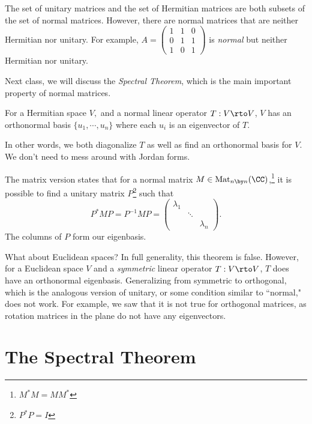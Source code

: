 The set of unitary matrices and the set of Hermitian matrices are both subsets of the set of normal matrices. However, there are normal matrices that are neither Hermitian nor unitary. For example, $A = \begin{pmatrix}1 & 1 & 0 \\ 0 & 1 & 1 \\ 1 & 0 & 1 \end{pmatrix}$ is \emph{normal} but neither Hermitian nor unitary. 

Next class, we will discuss the \emph{Spectral Theorem}, which is the main important property of normal matrices.
\begin{theorem}
For a Hermitian space $V,$ and a normal linear operator $T: V \rto V$, $V$ has an orthonormal basis $\{u_1, \cdots, u_n\}$ where each $u_i$ is an eigenvector of $T.$
\end{theorem}
In other words, we both diagonalize $T$ as well as find an orthonormal basis for $V$. 
We don't need to mess around with Jordan forms. 

The matrix version states that for a normal matrix $M \in \text{Mat}_{n \by n}(\CC)$,\footnote{$M^*M = MM^*$} it is possible to find a unitary matrix $P$\footnote{$P^*P = I$} such that \[P^*MP = P^{-1}MP = \begin{pmatrix} \lambda_1 & & \\
& \ddots & \\ & & \lambda_n\end{pmatrix}.\] The columns of $P$ form our eigenbasis. 

What about Euclidean spaces? In full generality, this theorem is false. However, for a Euclidean space $V$ and a \emph{symmetric} linear operator $T: V \rto V$, $T$ does have an orthonormal eigenbasis. Generalizing from symmetric to orthogonal, which is the analogous version of unitary, or some condition similar to ``normal," does not work. For example, we saw that it is not true for orthogonal matrices, as rotation matrices in the plane do not have any eigenvectors. 

\newpage


\section{The Spectral Theorem}

